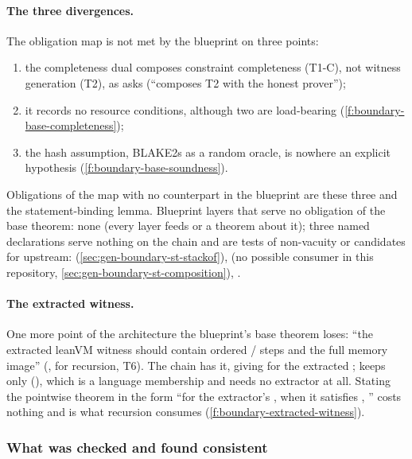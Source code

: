 \paragraph{The three divergences.} The obligation map is not met by the blueprint on three points:
\begin{enumerate}
\item the completeness dual composes constraint completeness (T1-C), not witness generation
  (T2), as  asks (\enquote{composes T2 with the honest prover});
\item it records no resource conditions, although two are load-bearing
  (\cref{f:boundary-base-completeness});
\item the hash assumption, BLAKE2s as a random oracle, is nowhere an explicit hypothesis
  (\cref{f:boundary-base-soundness}).
\end{enumerate}
Obligations of the map with no counterpart in the blueprint are these three and the
statement-binding lemma. Blueprint layers that serve no obligation of the base theorem: none
(every layer feeds  or a theorem about it); three named declarations serve nothing
on the chain and are tests of non-vacuity or candidates for upstream: 
(\cref{sec:gen-boundary-st-stackof}),  (no possible consumer in
this repository, \cref{sec:gen-boundary-st-composition}), .

\paragraph{The extracted witness.} One more point of the architecture the blueprint's base
theorem loses: \enquote{the extracted leanVM witness should contain ordered /
steps and the full memory image} (, for recursion, T6). The chain
has it,  giving  for
the extracted ;  keeps only
 (), which is a language membership and
needs no extractor at all. Stating the pointwise theorem in the form \enquote{for the extractor's
, when it satisfies ,
} costs
nothing and is what recursion consumes (\cref{f:boundary-extracted-witness}).

\subsubsection{What was checked and found consistent}\label{sec:gen-boundary-negative}

